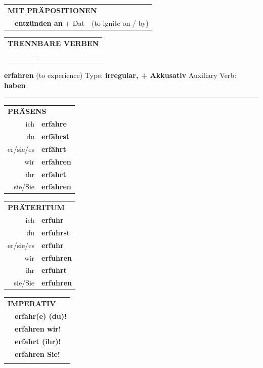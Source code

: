 \documentclass[10pt,a4paper]{revtex4-2}
\begin{document}
\begin{verbbox}
\vspace{10pt}

\begin{tabular}{lll}
\multicolumn{3}{l}{\textbf{MIT PRÄPOSITIONEN}}\\
& \textbf{entzünden an} + Dat & (to ignite on / by)\\
\end{tabular}
\hfill
\begin{tabular}{lll}
\multicolumn{3}{l}{\textbf{TRENNBARE VERBEN}}\\
& --- & \\
\end{tabular}
\vspace{-5pt}
\end{verbbox}


\begin{verbbox-acc}
    {\Large \bf erfahren} (to experience) \hfill Type: \textbf{irregular, + Akkusativ} \hfill Auxiliary Verb: \textbf{haben} 
    
     \vspace{5pt}

    \hrule
    
    \vspace{5pt}

  \begin{tabular}{rl}
     \multicolumn{2}{l}{\textbf{PRÄSENS} }\\
    ich & \textbf{erfahre}\\
    du & \textbf{erf\"ahrst}\\
    er/sie/es & \textbf{erf\"ahrt}\\
    wir & \textbf{erfahren}\\
    ihr & \textbf{erfahrt}\\
    sie/Sie & \textbf{erfahren}\\
  \end{tabular}
  \hfill
     \begin{tabular}{rl}
    \multicolumn{2}{l}{\textbf{PRÄTERITUM} }\\
    ich & \textbf{erfuhr}\\
    du & \textbf{erfuhrst}\\
    er/sie/es & \textbf{erfuhr}\\
    wir & \textbf{erfuhren}\\
    ihr & \textbf{erfuhrt}\\
    sie/Sie & \textbf{erfuhren}\\
  \end{tabular}
  \hfill
  \begin{tabular}{rl}
     \multicolumn{2}{l}{\textbf{IMPERATIV} }\\
   & \textbf{erfahr(e) (du)!}\\
   & \textbf{erfahren wir!}\\
   & \textbf{erfahrt (ihr)!}\\
   & \textbf{erfahren Sie!}\\
   & \vspace{10pt}
  \end{tabular}


\end{verbbox-acc}
\end{document}

